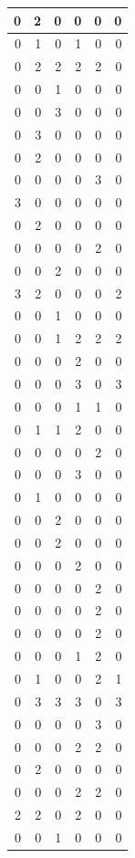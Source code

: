 \documentclass[
  12pt,
]{krantz}
\begin{document}
\begin{tabular}{r|r|r|r|r|r}
\hline
0 & 2 & 0 & 0 & 0 & 0\\
\hline
0 & 1 & 0 & 1 & 0 & 0\\
\hline
0 & 2 & 2 & 2 & 2 & 0\\
\hline
0 & 0 & 1 & 0 & 0 & 0\\
\hline
0 & 0 & 3 & 0 & 0 & 0\\
\hline
0 & 3 & 0 & 0 & 0 & 0\\
\hline
0 & 2 & 0 & 0 & 0 & 0\\
\hline
0 & 0 & 0 & 0 & 3 & 0\\
\hline
3 & 0 & 0 & 0 & 0 & 0\\
\hline
0 & 2 & 0 & 0 & 0 & 0\\
\hline
0 & 0 & 0 & 0 & 2 & 0\\
\hline
0 & 0 & 2 & 0 & 0 & 0\\
\hline
3 & 2 & 0 & 0 & 0 & 2\\
\hline
0 & 0 & 1 & 0 & 0 & 0\\
\hline
0 & 0 & 1 & 2 & 2 & 2\\
\hline
0 & 0 & 0 & 2 & 0 & 0\\
\hline
0 & 0 & 0 & 3 & 0 & 3\\
\hline
0 & 0 & 0 & 1 & 1 & 0\\
\hline
0 & 1 & 1 & 2 & 0 & 0\\
\hline
0 & 0 & 0 & 0 & 2 & 0\\
\hline
0 & 0 & 0 & 3 & 0 & 0\\
\hline
0 & 1 & 0 & 0 & 0 & 0\\
\hline
0 & 0 & 2 & 0 & 0 & 0\\
\hline
0 & 0 & 2 & 0 & 0 & 0\\
\hline
0 & 0 & 0 & 2 & 0 & 0\\
\hline
0 & 0 & 0 & 0 & 2 & 0\\
\hline
0 & 0 & 0 & 0 & 2 & 0\\
\hline
0 & 0 & 0 & 0 & 2 & 0\\
\hline
0 & 0 & 0 & 1 & 2 & 0\\
\hline
0 & 1 & 0 & 0 & 2 & 1\\
\hline
0 & 3 & 3 & 3 & 0 & 3\\
\hline
0 & 0 & 0 & 0 & 3 & 0\\
\hline
0 & 0 & 0 & 2 & 2 & 0\\
\hline
0 & 2 & 0 & 0 & 0 & 0\\
\hline
0 & 0 & 0 & 2 & 2 & 0\\
\hline
2 & 2 & 0 & 2 & 0 & 0\\
\hline
0 & 0 & 1 & 0 & 0 & 0\\

\end{tabular}
\end{document}
